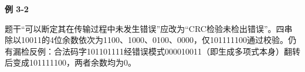 {\color{ink}\bfseries 例 3-2}\par\vspace{1bp}题干“可以断定其在传输过程中未发生错误”应改为“CRC检验未检出错误”。四串除以10011的4位余数依次为1100、1000、0100、0000，仅101111100通过校验。仍有漏检反例：合法码字101101111经错误模式000010011（即生成多项式本身）翻转后变成101111100，两者余数均为0。
